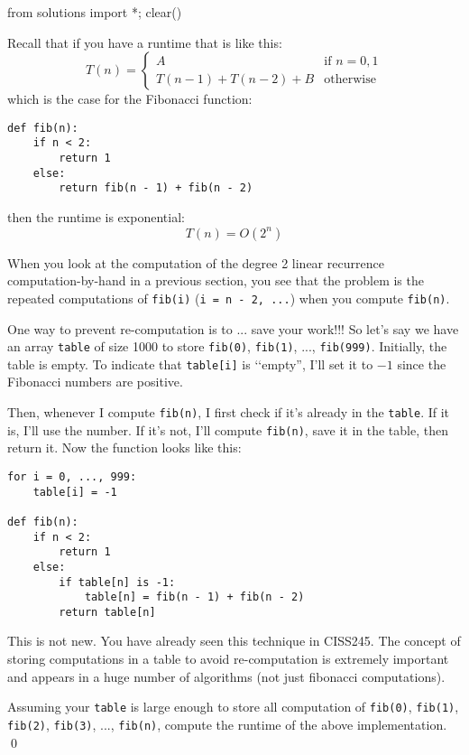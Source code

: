 \begin{python0}
from solutions import *; clear()
\end{python0}

Recall that if you have a runtime that is like this:
\[
T(n) 
= 
\begin{cases}
A                   & \text{if $n = 0, 1$} \\
T(n-1) + T(n-2) + B & \text{otherwise}
\end{cases}
\]
which is the case for the Fibonacci function:
\begin{Verbatim}[frame=single,fontsize=\footnotesize]
def fib(n):
    if n < 2:
        return 1
    else:
        return fib(n - 1) + fib(n - 2)
\end{Verbatim}
then the runtime is exponential:
\[
T(n) = O(2^n)
\]

When you look at the computation of the degree 2 linear recurrence
computation-by-hand in a previous section, 
you see that the problem is the repeated computations of 
\verb!fib(i)!
(\verb!i = n - 2, ...!) when you compute \verb!fib(n)!.

One way to prevent re-computation is to ... save your work!!!
So let's say we have an array \verb!table! of size 1000
to store \verb!fib(0)!, \verb!fib(1)!, ..., \verb!fib(999)!.
Initially, the table is empty.
To indicate that \verb!table[i]! is \lq\lq empty'',
I'll set it to $-1$ since the Fibonacci numbers are positive.

Then, whenever I compute \verb!fib(n)!, I first check if it's already in the 
\verb!table!.
If it is, I'll use the number.
If it's not, I'll compute \verb!fib(n)!, save it in the table,
then return it.
Now the function looks like this:
 
\begin{Verbatim}[frame=single,fontsize=\footnotesize]
for i = 0, ..., 999:
    table[i] = -1

def fib(n):
    if n < 2:
        return 1
    else:
        if table[n] is -1:
            table[n] = fib(n - 1) + fib(n - 2)
        return table[n]
\end{Verbatim}

This is not new.
You have already seen this technique in CISS245.
The concept of storing computations in a table to avoid
re-computation is extremely important and appears
in a huge number of algorithms (not just fibonacci computations).

\newpage
\begin{ex}
  Assuming your \verb!table! is large enough to store
  all computation of
  \verb!fib(0)!,
  \verb!fib(1)!,
  \verb!fib(2)!,
  \verb!fib(3)!,
  ...,
  \verb!fib(n)!,
  compute the runtime 
  of the above implementation.
\qed
\end{ex}

